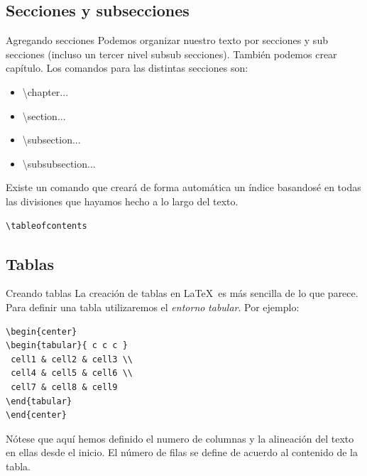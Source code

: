 \documentclass[11pt]{beamer}
\begin{document}
	\subsection{Secciones y subsecciones}
	\begin{frame}[containsverbatim]{Agregando secciones}
	\justifying	
			Podemos organizar nuestro texto por secciones y sub secciones (incluso un tercer nivel subsub secciones). Tambi\'en podemos crear cap\'itulo. Los comandos para las distintas secciones son:
			\begin{itemize}
				\item \textbackslash chapter{...}
				\item \textbackslash section{...}
				\item \textbackslash subsection{...}
				\item \textbackslash subsubsection{...}
			\end{itemize}
			Existe un comando que crear\'a de forma autom\'atica un \'indice basandos\'e en todas las divisiones que hayamos hecho a lo largo del texto.
			\begin{lstlisting}
\tableofcontents	
			\end{lstlisting}
	\end{frame}
	\subsection{Tablas}
	\begin{frame}[containsverbatim]{Creando tablas}
		\justifying
			La creaci\'on de tablas en \LaTeX\ es más sencilla de lo que parece.
			Para definir una tabla utilizaremos el \emph{entorno} \textit{tabular}.
			Por ejemplo: 
			\begin{lstlisting}[basicstyle=\small]
\begin{center}
\begin{tabular}{ c c c }
 cell1 & cell2 & cell3 \\ 
 cell4 & cell5 & cell6 \\  
 cell7 & cell8 & cell9    
\end{tabular}
\end{center}			\end{lstlisting}

Nótese que aquí hemos definido el numero de columnas y la alineación del texto en ellas
desde el inicio. El número de filas se define de acuerdo al contenido de la tabla.
\end{frame}	
\end{document}
